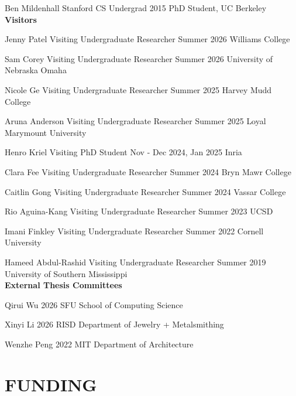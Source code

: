 \documentclass[line,margin]{res}
\begin{document}
\begin{resume}
\alumni
{Ben Mildenhall}
{Stanford CS Undergrad}
{2015}
{PhD Student, UC Berkeley}
\\


\textbf{Visitors}

\visitor
{Jenny Patel}
{Visiting Undergraduate Researcher}
{Summer 2026}
{Williams College}

\visitor
{Sam Corey}
{Visiting Undergraduate Researcher}
{Summer 2026}
{University of Nebraska Omaha}

\visitor
{Nicole Ge}
{Visiting Undergraduate Researcher}
{Summer 2025}
{Harvey Mudd College}

\visitor
{Aruna Anderson}
{Visiting Undergraduate Researcher}
{Summer 2025}
{Loyal Marymount University}

\visitor
{Henro Kriel}
{Visiting PhD Student}
{Nov - Dec 2024, Jan 2025}
{Inria}

\visitor
{Clara Fee}
{Visiting Undergraduate Researcher}
{Summer 2024}
{Bryn Mawr College}

\visitor
{Caitlin Gong}
{Visiting Undergraduate Researcher}
{Summer 2024}
{Vassar College}

\visitor
{Rio Aguina-Kang}
{Visiting Undergraduate Researcher}
{Summer 2023}
{UCSD}

\visitor
{Imani Finkley}
{Visiting Undergraduate Researcher}
{Summer 2022}
{Cornell University}

\visitor
{Hameed Abdul-Rashid}
{Visiting Undergraduate Researcher}
{Summer 2019}
{University of Southern Mississippi}
\\


\textbf{External Thesis Committees}

\thesiscomm
{Qirui Wu}
{2026}
{SFU School of Computing Science}

\thesiscomm
{Xinyi Li}
{2026}
{RISD Department of Jewelry + Metalsmithing}

\thesiscomm
{Wenzhe Peng}
{2022}
{MIT Department of Architecture}


\section{FUNDING}

\newcommand{\funding}[5] {
	\textbf{#1} \hfill #5\\
	#2 \\
	#3. #4
}


\end{resume}
\end{document}
